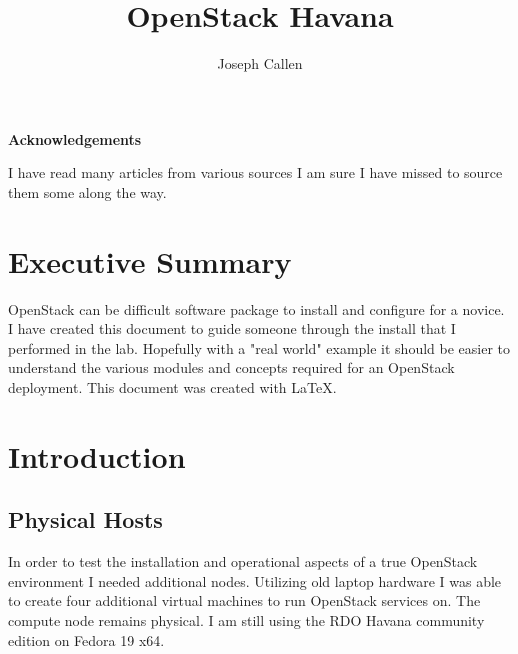 \documentclass[11pt,letterpaper,oneside]{book}
\title{OpenStack Havana}
\author{Joseph Callen}
\begin{document}
\frontmatter


\maketitle
\newenvironment{acknowledgements}%
    {\cleardoublepage\thispagestyle{empty}\null\vfill\begin{center}%
    \bfseries Acknowledgements\end{center}}%
    {\vfill\null}
        \begin{acknowledgements}
        I have read many articles from various sources I am sure I have missed to source them some along the way.  
        \end{acknowledgements}
\tableofcontents
\listoffigures
\listoftables
\lstlistoflistings
\mainmatter

\chapter*{Executive Summary}
OpenStack can be difficult software package to install and configure for a novice.  I have created this document to guide someone through the install that I performed in the lab.  Hopefully with a "real world" example it should be easier to understand the various modules and concepts required for an OpenStack deployment.  This document was created with \LaTeX.

\chapter{Introduction}
\section{Physical Hosts}
In order to test the installation and operational aspects of a true OpenStack environment I needed additional nodes.  Utilizing old laptop hardware I was able to create four additional virtual machines to run OpenStack services on.  The compute node remains physical.  I am still using the RDO Havana community edition on Fedora 19 x64.\\
\end{document}
